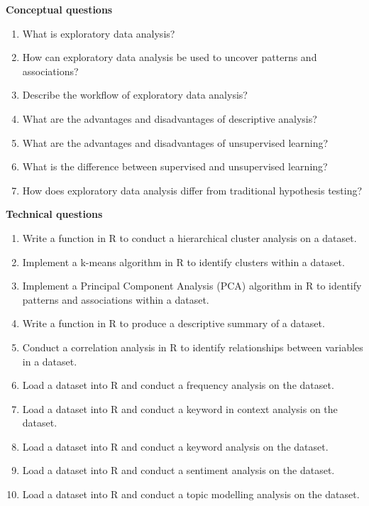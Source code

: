 \documentclass[
  letterpaper,
  DIV=11,
  numbers=noendperiod]{scrreport}
\providecommand{\tightlist}{%
  \setlength{\itemsep}{0pt}\setlength{\parskip}{0pt}}\usepackage{longtable,booktabs,array}
\theoremstyle{definition}
\theoremstyle{remark}
\begin{document}
\begin{tcolorbox}[enhanced jigsaw, breakable, colback=white, rightrule=.15mm, arc=.35mm, left=2mm, toprule=.15mm, leftrule=.75mm, bottomrule=.15mm, opacityback=0]

 \textbf{Conceptual questions}

\begin{enumerate}
\def\labelenumi{\arabic{enumi}.}
\tightlist
\item
  What is exploratory data analysis?
\item
  How can exploratory data analysis be used to uncover patterns and
  associations?
\item
  Describe the workflow of exploratory data analysis?
\item
  What are the advantages and disadvantages of descriptive analysis?
\item
  What are the advantages and disadvantages of unsupervised learning?
\item
  What is the difference between supervised and unsupervised learning?
\item
  How does exploratory data analysis differ from traditional hypothesis
  testing?
\end{enumerate}

\end{tcolorbox}

\begin{tcolorbox}[enhanced jigsaw, breakable, colback=white, rightrule=.15mm, arc=.35mm, left=2mm, toprule=.15mm, leftrule=.75mm, bottomrule=.15mm, opacityback=0]

 \textbf{Technical questions}

\begin{enumerate}
\def\labelenumi{\arabic{enumi}.}
\tightlist
\item
  Write a function in R to conduct a hierarchical cluster analysis on a
  dataset.
\item
  Implement a k-means algorithm in R to identify clusters within a
  dataset.
\item
  Implement a Principal Component Analysis (PCA) algorithm in R to
  identify patterns and associations within a dataset.
\item
  Write a function in R to produce a descriptive summary of a dataset.
\item
  Conduct a correlation analysis in R to identify relationships between
  variables in a dataset.
\item
  Load a dataset into R and conduct a frequency analysis on the dataset.
\item
  Load a dataset into R and conduct a keyword in context analysis on the
  dataset.
\item
  Load a dataset into R and conduct a keyword analysis on the dataset.
\item
  Load a dataset into R and conduct a sentiment analysis on the dataset.
\item
  Load a dataset into R and conduct a topic modelling analysis on the
  dataset.
\end{enumerate}

\end{tcolorbox}
\end{document}

